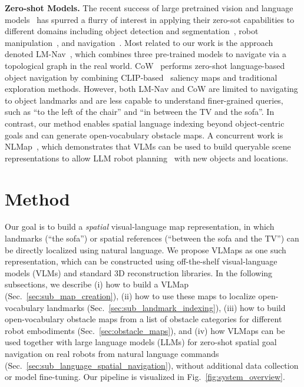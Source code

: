 \documentclass[letterpaper, 10 pt, conference]{ieeeconf}  %
\begin{document}
\textbf{Zero-shot Models.}
The recent success of large pretrained vision and language models~\cite{radford2021learning,brown2020language} has spurred a flurry of interest in applying their zero-sot capabilities to different domains including object detection and segmentation~\cite{kamath2021mdetr, gu2021open, li2021language}, robot manipulation~\cite{shridhar2022cliport, mees2022calvin, mees2022hulc, mees22hulc2}, and navigation~\cite{shah2022lm,gadre2022clip,chen2022nlmapsaycan}.
    Most related to our work is the approach denoted LM-Nav~\cite{shah2022lm}, which combines three pre-trained models to navigate via a topological graph in the real world. CoW~\cite{gadre2022clip} performs zero-shot language-based object navigation by combining CLIP-based~\cite{radford2021learning} saliency maps and traditional exploration methods. However, both LM-Nav \cite{shah2022lm} and CoW \cite{gadre2022clip} are limited to navigating to object landmarks and are less capable to understand finer-grained queries, such as ``to the left of the chair'' and ``in between the TV and the sofa''. In contrast, our method enables spatial language indexing beyond object-centric goals and can generate open-vocabulary obstacle maps. A concurrent work is NLMap~\cite{chen2022nlmapsaycan}, which demonstrates that VLMs can be used to build queryable scene representations to allow LLM robot planning~\cite{ahn2022can} with new objects and locations.

\section{Method}
Our goal is to build a \textit{spatial} visual-language map representation, in which landmarks (``the sofa'') or spatial references (``between the sofa and the TV'') can be directly localized using natural language. We propose VLMaps as one such representation, which can be constructed using off-the-shelf visual-language models (VLMs) and standard 3D reconstruction libraries. In the following subsections, we describe (i) how to build a VLMap (Sec.~\ref{sec:sub_map_creation}), (ii) how to use these maps to localize open-vocabulary landmarks (Sec.~\ref{sec:sub_landmark_indexing}), (iii) how to build open-vocabulary obstacle maps from a list of obstacle categories for different robot embodiments (Sec.~\ref{sec:obstacle_maps}), and (iv) how VLMaps can be used together with large language models (LLMs) for zero-shot spatial goal navigation on real robots from natural language commands (Sec.~\ref{sec:sub_language_spatial_navigation}), without additional data collection or model fine-tuning. Our pipeline is visualized in Fig.~\ref{fig:system_overview}. 
\end{document}
